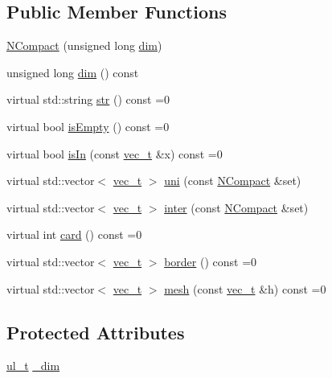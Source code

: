 \subsection*{Public Member Functions}
\begin{DoxyCompactItemize}
\item 
\mbox{\hyperlink{class_n_compact_adca59e9cffb585724a81bb3fa6cc735f}{N\+Compact}} (unsigned long \mbox{\hyperlink{class_n_compact_a795625c0eda03eb2e113b125948224b0}{dim}})
\item 
unsigned long \mbox{\hyperlink{class_n_compact_a795625c0eda03eb2e113b125948224b0}{dim}} () const
\item 
virtual std\+::string \mbox{\hyperlink{class_n_compact_af1879d7342bf6d9902ed5473f6e89038}{str}} () const =0
\item 
virtual bool \mbox{\hyperlink{class_n_compact_a574764d7ac4fe2393a739b67bf57a7f1}{is\+Empty}} () const =0
\item 
virtual bool \mbox{\hyperlink{class_n_compact_a387e86914973c69b292782f640368680}{is\+In}} (const \mbox{\hyperlink{group___n_algebra_ga0a2cfc67e738a3d73e4f12098c4c07f6}{vec\+\_\+t}} \&x) const =0
\item 
virtual std\+::vector$<$ \mbox{\hyperlink{group___n_algebra_ga0a2cfc67e738a3d73e4f12098c4c07f6}{vec\+\_\+t}} $>$ \mbox{\hyperlink{class_n_compact_a64fb223b2f03a10d80e1290f1947f026}{uni}} (const \mbox{\hyperlink{class_n_compact}{N\+Compact}} \&set)
\item 
virtual std\+::vector$<$ \mbox{\hyperlink{group___n_algebra_ga0a2cfc67e738a3d73e4f12098c4c07f6}{vec\+\_\+t}} $>$ \mbox{\hyperlink{class_n_compact_a5806924822793fdd89f4168e1e8c4d3c}{inter}} (const \mbox{\hyperlink{class_n_compact}{N\+Compact}} \&set)
\item 
virtual int \mbox{\hyperlink{class_n_compact_a816bb4976567a7bfed57763ce717b685}{card}} () const =0
\item 
virtual std\+::vector$<$ \mbox{\hyperlink{group___n_algebra_ga0a2cfc67e738a3d73e4f12098c4c07f6}{vec\+\_\+t}} $>$ \mbox{\hyperlink{class_n_compact_af7acc50099e80fc13ce32c97e6857308}{border}} () const =0
\item 
virtual std\+::vector$<$ \mbox{\hyperlink{group___n_algebra_ga0a2cfc67e738a3d73e4f12098c4c07f6}{vec\+\_\+t}} $>$ \mbox{\hyperlink{class_n_compact_ad4cdc60c75ca433c63f44ec13063e2fe}{mesh}} (const \mbox{\hyperlink{group___n_algebra_ga0a2cfc67e738a3d73e4f12098c4c07f6}{vec\+\_\+t}} \&h) const =0
\end{DoxyCompactItemize}
\subsection*{Protected Attributes}
\begin{DoxyCompactItemize}
\item 
\mbox{\hyperlink{typedef_8h_a1b140a2034db3f5dfe18a987745df43a}{ul\+\_\+t}} \mbox{\hyperlink{class_n_compact_a0f13086af28c4e2dbbcaa308f28ed506}{\+\_\+dim}}
\end{DoxyCompactItemize}
